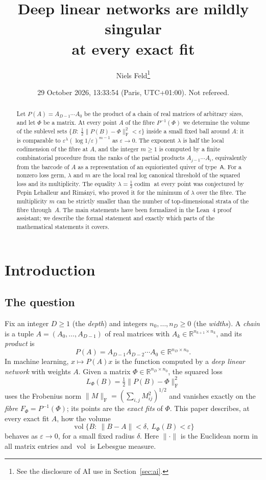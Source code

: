 \documentclass[11pt,a4paper]{article}
\theoremstyle{definition}
\theoremstyle{remark}
\numberwithin{equation}{section}
\newcommand{\R}{\mathbb{R}}
\newcommand{\codim}{\operatorname{codim}}
\newcommand{\vol}{\operatorname{vol}}
\newcommand{\Fr}[1]{\lVert #1\rVert_{\mathrm F}}
\newcommand{\norm}[1]{\lVert #1\rVert}
\newcommand{\eps}{\varepsilon}
\begin{document}
\title{Deep linear networks are mildly singular\\ at every exact fit}
\author{Niels Feld\thanks{See the disclosure of AI use in Section~\ref{sec:ai}.}}
\date{29 October 2026, 13:33:54 (Paris, UTC+01:00). Not refereed.}

\maketitle
\begin{abstract}
Let $P(A)=A_{D-1}\cdots A_0$ be the product of a chain of real matrices of arbitrary sizes, and let $\Phi$ be a matrix. At every point $A$ of the fibre $P^{-1}(\Phi)$ we determine the volume of the sublevel sets $\{B:\ \tfrac12\Fr{P(B)-\Phi}^2<\eps\}$ inside a small fixed ball around $A$: it is comparable to $\eps^{\lambda}(\log 1/\eps)^{m-1}$ as $\eps\to0$. The exponent $\lambda$ is half the local codimension of the fibre at $A$, and the integer $m\ge1$ is computed by a finite combinatorial procedure from the ranks of the partial products $A_{j-1}\cdots A_i$, equivalently from the barcode of $A$ as a representation of an equioriented quiver of type~$\mathsf A$. For a nonzero loss germ, $\lambda$ and $m$ are the local real log canonical threshold of the squared loss and its multiplicity. The equality $\lambda=\tfrac12\codim$ at every point was conjectured by Pepin Lehalleur and Rimányi, who proved it for the minimum of $\lambda$ over the fibre. The multiplicity $m$ can be strictly smaller than the number of top-dimensional strata of the fibre through~$A$. The main statements have been formalized in the Lean~4 proof assistant; we describe the formal statement and exactly which parts of the mathematical statements it covers.
\end{abstract}

\setcounter{tocdepth}{2}
\tableofcontents
\section{Introduction}\label{sec:intro}

\subsection{The question}
Fix an integer $D\ge1$ (the \emph{depth}) and integers $n_0,\dots,n_D\ge0$ (the \emph{widths}). A \emph{chain} is a tuple $A=(A_0,\dots,A_{D-1})$ of real matrices with $A_k\in\R^{n_{k+1}\times n_k}$, and its \emph{product} is
\[
P(A)=A_{D-1}A_{D-2}\cdots A_0\in\R^{n_D\times n_0}.
\]
In machine learning, $x\mapsto P(A)x$ is the function computed by a \emph{deep linear network} with weights $A$. Given a matrix $\Phi\in\R^{n_D\times n_0}$, the squared loss
\[
L_\Phi(B)=\tfrac12\Fr{P(B)-\Phi}^2
\]
uses the Frobenius norm $\Fr M=(\sum_{i,j}M_{ij}^2)^{1/2}$ and vanishes exactly on the \emph{fibre} $F_\Phi=P^{-1}(\Phi)$; its points are the \emph{exact fits} of $\Phi$. This paper describes, at every exact fit $A$, how the volume
\[
\vol\{B:\ \norm{B-A}<\delta,\ L_\Phi(B)<\eps\}
\]
behaves as $\eps\to0$, for a small fixed radius $\delta$. Here $\norm\cdot$ is the Euclidean norm in all matrix entries and $\vol$ is Lebesgue measure.
\end{document}
